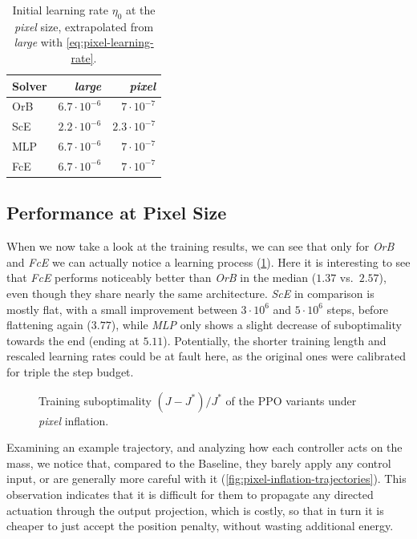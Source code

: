 \begin{table}[htbp]
    \centering
    \caption{Initial learning rate $\eta_0$ at the \emph{pixel} size, extrapolated from \emph{large} with \eqref{eq:pixel-learning-rate}.}
    \label{tab:pixel-learning-rates}
    \begin{tabular}{@{}lrr@{}}
        \toprule
        Solver & \emph{large} & \emph{pixel} \\
        \midrule
        OrB & $6.7 \cdot 10^{-6}$ & $7 \cdot 10^{-7}$ \\
        ScE & $2.2 \cdot 10^{-6}$ & $2.3 \cdot 10^{-7}$ \\
        MLP & $6.7 \cdot 10^{-6}$ & $7 \cdot 10^{-7}$ \\
        FcE & $6.7 \cdot 10^{-6}$ & $7 \cdot 10^{-7}$ \\
        \bottomrule
    \end{tabular}
\end{table}

\subsection{Performance at Pixel Size}
\label{subsec:pixel-inflation-results}

When we now take a look at the training results, we can see that only for \emph{OrB} and \emph{FcE}
we can actually notice a learning process (\cref{fig:pixel-inflation-curves}). Here it is interesting to see that \emph{FcE} performs
noticeably better than \emph{OrB} in the median ($1.37$ vs.\ $2.57$), even though they share nearly the same architecture.
\emph{ScE} in comparison is mostly flat, with a small improvement between $3 \cdot 10^{6}$ and $5 \cdot 10^{6}$ steps, before flattening again ($3.77$), while
\emph{MLP} only shows a slight decrease of suboptimality towards the end (ending at $5.11$).
Potentially, the shorter training length and rescaled learning rates could be at fault here, as the original ones were calibrated
for triple the step budget.

\begin{figure}[htbp]
    \centering
    \caption{Training suboptimality $(J - J^{*})/J^{*}$ of the PPO variants under \emph{pixel} inflation.}
    \label{fig:pixel-inflation-curves}
\end{figure}

Examining an example trajectory, and analyzing how each controller acts on the
mass, we notice that, compared to the Baseline, they barely apply any control input, or are
generally more careful with it (\cref{fig:pixel-inflation-trajectories}). This observation indicates that it is difficult
for them to propagate any directed actuation through the output projection, which is costly, so that in turn it is cheaper
to just accept the position penalty, without wasting additional energy.

